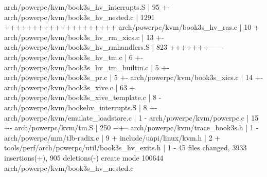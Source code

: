 \documentclass[landscape, 14pt]{report}
\newenvironment{Shaded}{}{}
\newcommand{\DecValTok}[1]{\textcolor[rgb]{0.25,0.63,0.44}{#1}}
\newcommand{\NormalTok}[1]{#1}
\begin{document}
\begin{Shaded}
\begin{Highlighting}[]
\NormalTok{ arch/powerpc/kvm/book3s_hv_interrupts.S            |   }\DecValTok{95}\NormalTok{ +-}
\NormalTok{ arch/powerpc/kvm/book3s_hv_nested.c                | }\DecValTok{1291}\NormalTok{ ++++++++++++++++++++}
\NormalTok{ arch/powerpc/kvm/book3s_hv_ras.c                   |   }\DecValTok{10}\NormalTok{ +}
\NormalTok{ arch/powerpc/kvm/book3s_hv_rm_xics.c               |   }\DecValTok{13}\NormalTok{ +-}
\NormalTok{ arch/powerpc/kvm/book3s_hv_rmhandlers.S            |  }\DecValTok{823}\NormalTok{ +++++++------}
\NormalTok{ arch/powerpc/kvm/book3s_hv_tm.c                    |    }\DecValTok{6}\NormalTok{ +-}
\NormalTok{ arch/powerpc/kvm/book3s_hv_tm_builtin.c            |    }\DecValTok{5}\NormalTok{ +-}
\NormalTok{ arch/powerpc/kvm/book3s_pr.c                       |    }\DecValTok{5}\NormalTok{ +-}
\NormalTok{ arch/powerpc/kvm/book3s_xics.c                     |   }\DecValTok{14}\NormalTok{ +-}
\NormalTok{ arch/powerpc/kvm/book3s_xive.c                     |   }\DecValTok{63}\NormalTok{ +}
\NormalTok{ arch/powerpc/kvm/book3s_xive_template.c            |    }\DecValTok{8}\NormalTok{ -}
\NormalTok{ arch/powerpc/kvm/bookehv_interrupts.S              |    }\DecValTok{8}\NormalTok{ +-}
\NormalTok{ arch/powerpc/kvm/emulate_loadstore.c               |    }\DecValTok{1}\NormalTok{ -}
\NormalTok{ arch/powerpc/kvm/powerpc.c                         |   }\DecValTok{15}\NormalTok{ +-}
\NormalTok{ arch/powerpc/kvm/tm.S                              |  }\DecValTok{250}\NormalTok{ ++--}
\NormalTok{ arch/powerpc/kvm/trace_book3s.h                    |    }\DecValTok{1}\NormalTok{ -}
\NormalTok{ arch/powerpc/mm/tlb-radix.c                        |    }\DecValTok{9}\NormalTok{ +}
\NormalTok{ include/uapi/linux/kvm.h                           |    }\DecValTok{2}\NormalTok{ +}
\NormalTok{ tools/perf/arch/powerpc/util/book3s_hv_exits.h     |    }\DecValTok{1}\NormalTok{ -}
 \DecValTok{45}\NormalTok{ files changed, }\DecValTok{3933}\NormalTok{ insertions(+), }\DecValTok{905}\NormalTok{ deletions(-)}
\NormalTok{ create mode }\DecValTok{100644}\NormalTok{ arch/powerpc/kvm/book3s_hv_nested.c}
\end{Highlighting}
\end{Shaded}
\end{document}
